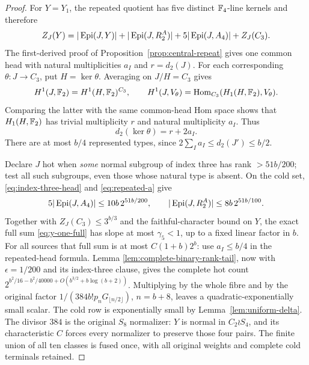 \begin{proof}
For $Y=Y_1$, the repeated quotient has five distinct $\mathbb F_4$-line
kernels and therefore
\begin{equation}\label{eq:y-one-full}
 Z_J(Y)=|\operatorname{Epi}(J,Y)|+|\operatorname{Epi}(J,R_2^A)|
                  +5|\operatorname{Epi}(J,A_4)|+Z_J(C_3).
\end{equation}
The first-derived proof of Proposition~\ref{prop:central-repeat}
gives one common head with natural multiplicities $a_I$ and
$r=d_2(J)$. For each corresponding $\theta:J\to C_3$, put
$H=\ker\theta$. Averaging on $J/H=C_3$ gives
\[
 H^1(J,\mathbb F_2)=H^1(H,\mathbb F_2)^{C_3},\qquad
 H^1(J,V_\theta)=\operatorname{Hom}_{C_3}(H_1(H,\mathbb F_2),V_\theta).
\]
Comparing the latter with the same common-head Hom space shows
that $H_1(H,\mathbb F_2)$ has trivial multiplicity $r$ and natural
multiplicity $a_I$. Thus
\begin{equation}\label{eq:index-three-head}
 d_2(\ker\theta)=r+2a_I.
\end{equation}
There are at most $b/4$ represented types, since
$2\sum_Ia_I\leq d_2(J')\leq b/2$.

Declare $J$ hot when \emph{some} normal subgroup of index three
has rank $>51b/200$; test all such subgroups, even those whose
natural type is absent. On the cold set, \eqref{eq:index-three-head}
and \eqref{eq:repeated-a} give
\[
 5|\operatorname{Epi}(J,A_4)|\leq10b\,2^{51b/200},\qquad
 |\operatorname{Epi}(J,R_2^A)|\leq8b\,2^{51b/100}.
\]
Together with $Z_J(C_3)\leq3^{b/3}$ and the faithful-character
bound on $Y$, the exact full sum \eqref{eq:y-one-full} has slope
at most $\gamma_5<1$, up to a fixed linear factor in $b$.
For all sources that full sum is at most $C(1+b)2^b$:
use $a_I\leq b/4$ in the repeated-head formula. Lemma
\ref{lem:complete-binary-rank-tail}, now with $\epsilon=1/200$
and its index-three clause, gives the complete hot count
$2^{b^2/16-b^2/40000+O(b^{3/2}+b\log(b+2))}$.
Multiplying by the whole fibre and by the original factor
$1/(384b!p_nG_{\lfloor n/2\rfloor})$, $n=b+8$, leaves a
quadratic-exponentially small scalar. The cold row is exponentially
small by Lemma~\ref{lem:uniform-delta}. The divisor $384$ is the
original $S_8$ normalizer: $Y$ is normal in $C_2\wr S_4$, and its
characteristic $C$ forces every normalizer to preserve those four
pairs. The finite union of all ten classes is fused once, with
all original weights and complete cold terminals retained.
\end{proof}
